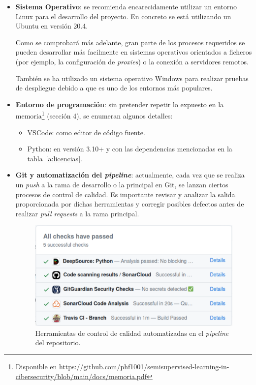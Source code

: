 \begin{itemize}

\item \textbf{Sistema Operativo}: se recomienda encarecidamente utilizar un entorno Linux para el desarrollo del proyecto. En concreto se está utilizando un Ubuntu en versión 20.4.

Como se comprobará más adelante, gran parte de los procesos requeridos se pueden desarrollar más facilmente en sistemas operativos orientados a ficheros (por ejemplo, la configuración de \textit{proxies}) o la conexión a servidores remotos.

También se ha utilizado un sistema operativo Windows para realizar pruebas de despliegue debido a que es uno de los entornos más populares.


\item \textbf{Entorno de programación}: sin pretender repetir lo expuesto en la memoria\footnote{Disponible en \url{https://github.com/phf1001/semisupervised-learning-in-cibersecurity/blob/main/docs/memoria.pdf}} (sección 4), se enumeran algunos detalles:

\begin{itemize}
	\item VSCode: como editor de código fuente.
	\item Python: en versión 3.10+ y con las dependencias mencionadas en la tabla~\ref{a:licencias}.
\end{itemize}

\item \textbf{Git y automatización del \textit{pipeline}}: actualmente, cada vez que se realiza un \textit{push} a la rama de desarrollo o la principal en Git, se lanzan ciertos procesos de control de calidad. Es importante revisar y analizar la salida proporcionada por dichas herramientas y corregir posibles defectos antes de realizar \textit{pull requests} a la rama principal.

\begin{figure}[h]
	\caption[Herramientas: control de calidad automatizado en el \textit{pipeline}.]{Herramientas de control de calidad automatizadas en el \textit{pipeline} del repositorio.}
	\centering
	\includegraphics[scale=0.2]{../img/anexos/manual/gitpipeline}
\end{figure}


\end{itemize}
